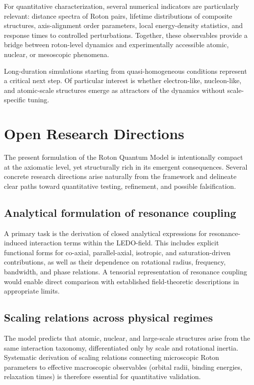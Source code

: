 \documentclass[11pt,a4paper]{article}
\begin{document}
For quantitative characterization, several numerical indicators are particularly relevant:
distance spectra of Roton pairs, lifetime distributions of composite structures, axis-alignment
order parameters, local energy-density statistics, and response times to controlled perturbations.
Together, these observables provide a bridge between roton-level dynamics and experimentally
accessible atomic, nuclear, or mesoscopic phenomena.

Long-duration simulations starting from quasi-homogeneous conditions represent a critical
next step.
Of particular interest is whether electron-like, nucleon-like, and atomic-scale structures
emerge as attractors of the dynamics without scale-specific tuning.




\section{Open Research Directions}

The present formulation of the Roton Quantum Model is intentionally compact at the axiomatic
level, yet structurally rich in its emergent consequences. Several concrete research
directions arise naturally from the framework and delineate clear paths toward quantitative
testing, refinement, and possible falsification.

\subsection*{Analytical formulation of resonance coupling}

A primary task is the derivation of closed analytical expressions for resonance-induced
interaction terms within the LEDO-field. This includes explicit functional forms for
co-axial, parallel-axial, isotropic, and saturation-driven contributions, as well as their
dependence on rotational radius, frequency, bandwidth, and phase relations. A tensorial
representation of resonance coupling would enable direct comparison with established
field-theoretic descriptions in appropriate limits.

\subsection*{Scaling relations across physical regimes}

The model predicts that atomic, nuclear, and large-scale structures arise from the same
interaction taxonomy, differentiated only by scale and rotational inertia. Systematic
derivation of scaling relations connecting microscopic Roton parameters to effective
macroscopic observables (orbital radii, binding energies, relaxation times) is therefore
essential for quantitative validation.
\end{document}
